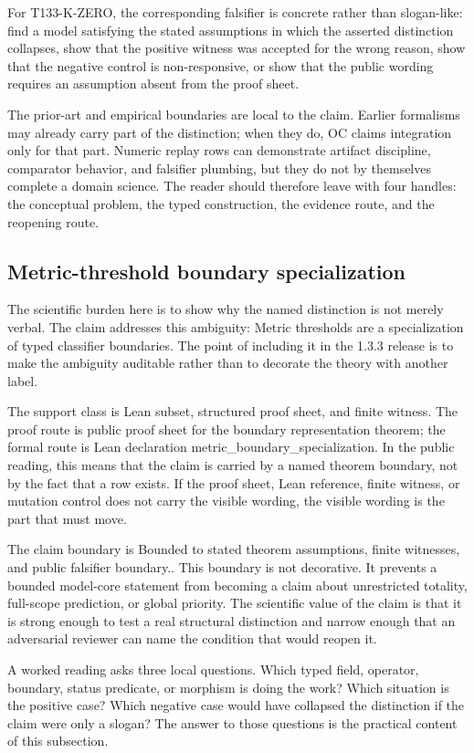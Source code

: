 For T133-K-ZERO, the corresponding falsifier is concrete rather than slogan-like: find a model satisfying the stated assumptions in which the asserted distinction collapses, show that the positive witness was accepted for the wrong reason, show that the negative control is non-responsive, or show that the public wording requires an assumption absent from the proof sheet.

The prior-art and empirical boundaries are local to the claim. Earlier formalisms may already carry part of the distinction; when they do, OC claims integration only for that part. Numeric replay rows can demonstrate artifact discipline, comparator behavior, and falsifier plumbing, but they do not by themselves complete a domain science. The reader should therefore leave with four handles: the conceptual problem, the typed construction, the evidence route, and the reopening route.

\subsection{Metric-threshold boundary specialization}
The scientific burden here is to show why the named distinction is not merely verbal. The claim addresses this ambiguity: Metric thresholds are a specialization of typed classifier boundaries. The point of including it in the 1.3.3 release is to make the ambiguity auditable rather than to decorate the theory with another label.

The support class is Lean subset, structured proof sheet, and finite witness. The proof route is public proof sheet for the boundary representation theorem; the formal route is Lean declaration metric\_boundary\_specialization. In the public reading, this means that the claim is carried by a named theorem boundary, not by the fact that a row exists. If the proof sheet, Lean reference, finite witness, or mutation control does not carry the visible wording, the visible wording is the part that must move.

The claim boundary is Bounded to stated theorem assumptions, finite witnesses, and public falsifier boundary.. This boundary is not decorative. It prevents a bounded model-core statement from becoming a claim about unrestricted totality, full-scope prediction, or global priority. The scientific value of the claim is that it is strong enough to test a real structural distinction and narrow enough that an adversarial reviewer can name the condition that would reopen it.

A worked reading asks three local questions. Which typed field, operator, boundary, status predicate, or morphism is doing the work? Which situation is the positive case? Which negative case would have collapsed the distinction if the claim were only a slogan? The answer to those questions is the practical content of this subsection.

